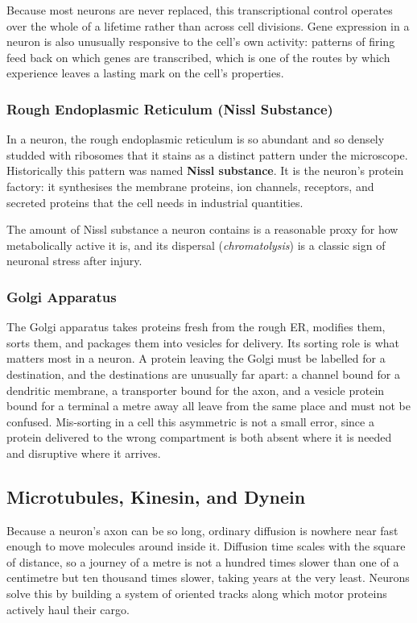 \documentclass[11pt]{article}
\begin{document}
Because most neurons are never replaced, this transcriptional control operates over the whole of a lifetime rather than across cell divisions. Gene expression in a neuron is also unusually responsive to the cell's own activity: patterns of firing feed back on which genes are transcribed, which is one of the routes by which experience leaves a lasting mark on the cell's properties.

\subsubsection{Rough Endoplasmic Reticulum (Nissl Substance)}

In a neuron, the rough endoplasmic reticulum is so abundant and so densely studded with ribosomes that it stains as a distinct pattern under the microscope. Historically this pattern was named \textbf{Nissl substance}. It is the neuron's protein factory: it synthesises the membrane proteins, ion channels, receptors, and secreted proteins that the cell needs in industrial quantities.

The amount of Nissl substance a neuron contains is a reasonable proxy for how metabolically active it is, and its dispersal (\textit{chromatolysis}) is a classic sign of neuronal stress after injury.

\subsubsection{Golgi Apparatus}

The Golgi apparatus takes proteins fresh from the rough ER, modifies them, sorts them, and packages them into vesicles for delivery. Its sorting role is what matters most in a neuron. A protein leaving the Golgi must be labelled for a destination, and the destinations are unusually far apart: a channel bound for a dendritic membrane, a transporter bound for the axon, and a vesicle protein bound for a terminal a metre away all leave from the same place and must not be confused. Mis-sorting in a cell this asymmetric is not a small error, since a protein delivered to the wrong compartment is both absent where it is needed and disruptive where it arrives.

\subsection{Microtubules, Kinesin, and Dynein}

Because a neuron's axon can be so long, ordinary diffusion is nowhere near fast enough to move molecules around inside it. Diffusion time scales with the square of distance, so a journey of a metre is not a hundred times slower than one of a centimetre but ten thousand times slower, taking years at the very least. Neurons solve this by building a system of oriented tracks along which motor proteins actively haul their cargo.
\end{document}
